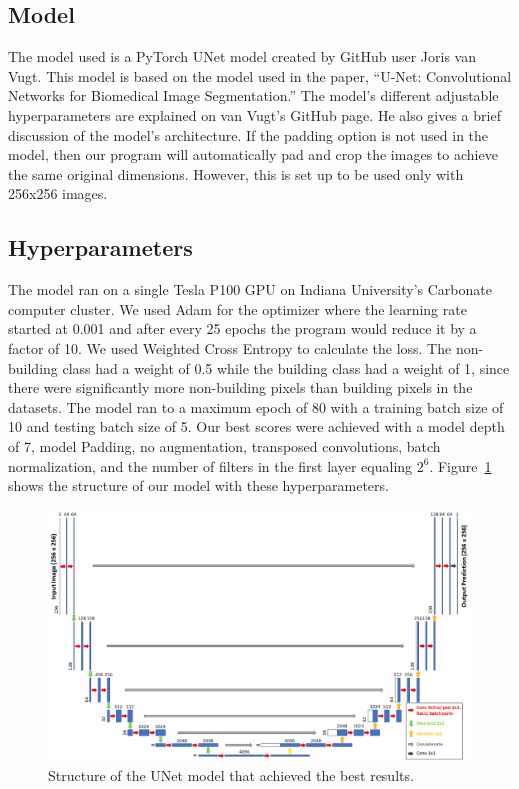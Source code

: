 \documentclass[acmtog, authorversion]{acmart}
\begin{document}
\subsection{Model}
The model used is a PyTorch UNet model created by GitHub user Joris van Vugt\cite{Joris2019}. This model is based on the model used in the paper, “U-Net: Convolutional Networks for Biomedical Image Segmentation.”\cite{ronneberger2015unet} The model’s different adjustable hyperparameters are explained on van Vugt’s GitHub page. He also gives a brief discussion of the model’s architecture. If the padding option is not used in the model, then our program will automatically pad and crop the images to achieve the same original dimensions. However, this is set up to be used only with 256x256 images.

\subsection{Hyperparameters}
 The model ran on a single Tesla P100 GPU on Indiana University’s Carbonate computer cluster. We used Adam\cite{kingma2014adam} for the optimizer where the learning rate started at 0.001 and after every 25 epochs the program would reduce it by a factor of 10. We used Weighted Cross Entropy\cite{Raul2018, Pytorch2019} to calculate the loss. The non-building class had a weight of 0.5 while the building class had a weight of 1, since there were significantly more non-building pixels than building pixels in the datasets. The model ran to a maximum epoch of 80 with a training batch size of 10 and testing batch size of 5. Our best scores were achieved with a model depth of 7, model Padding, no augmentation, transposed convolutions, batch normalization, and the number of filters in the first layer equaling $2^6$. Figure~\ref{fig:model} shows the structure of our model with these hyperparameters.

\begin{figure}
  \includegraphics[width=0.7\linewidth]{Images/UNetModel.png}
  \caption{Structure of the UNet model that achieved the best results.}
  \label{fig:model}
\end{figure}
\end{document}
